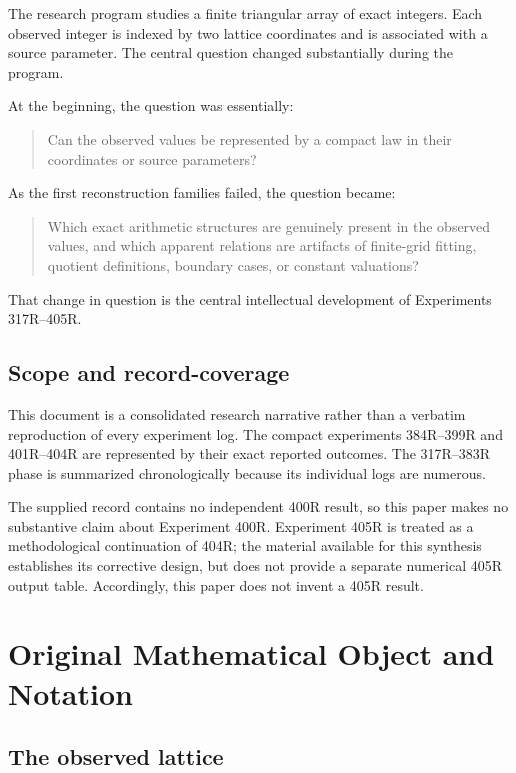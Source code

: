 \documentclass[11pt,a4paper]{article}
\begin{document}
The research program studies a finite triangular array of exact integers. Each observed integer is indexed by two lattice coordinates and is associated with a source parameter. The central question changed substantially during the program.

At the beginning, the question was essentially:
\begin{quote}
Can the observed values be represented by a compact law in their coordinates or source parameters?
\end{quote}

As the first reconstruction families failed, the question became:
\begin{quote}
Which exact arithmetic structures are genuinely present in the observed values, and which apparent relations are artifacts of finite-grid fitting, quotient definitions, boundary cases, or constant valuations?
\end{quote}

That change in question is the central intellectual development of Experiments 317R--405R.

\subsection{Scope and record-coverage}

This document is a consolidated research narrative rather than a verbatim reproduction of every experiment log. The compact experiments 384R--399R and 401R--404R are represented by their exact reported outcomes. The 317R--383R phase is summarized chronologically because its individual logs are numerous.

The supplied record contains no independent 400R result, so this paper makes no substantive claim about Experiment 400R. Experiment 405R is treated as a methodological continuation of 404R; the material available for this synthesis establishes its corrective design, but does not provide a separate numerical 405R output table. Accordingly, this paper does not invent a 405R result.

\section{Original Mathematical Object and Notation}

\subsection{The observed lattice}
\end{document}

